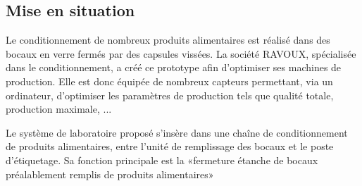 \documentclass[10pt,fleqn]{article} %
\begin{document}

\vspace{4.4cm}
\pagestyle{fancy}
\thispagestyle{plain}


\def\columnseprulecolor{\color{ocre}}
\setlength{\columnseprule}{0.4pt} 

\ifprof
\else
\begin{multicols}{2}
\fi


\subsection*{Mise en situation}
%

Le conditionnement de nombreux produits alimentaires est réalisé dans des bocaux en verre fermés par des capsules vissées. La société RAVOUX, spécialisée dans le conditionnement, a créé ce prototype afin d'optimiser ses machines de production. Elle est donc équipée de nombreux capteurs permettant, via un ordinateur, d'optimiser les paramètres de production tels que qualité totale, production maximale, ...

Le système de laboratoire proposé s'insère dans une chaîne de conditionnement de produits alimentaires, entre l'unité de remplissage des bocaux et le poste d'étiquetage. Sa fonction principale est la «fermeture étanche de bocaux préalablement remplis de produits alimentaires»


%


\end{multicols}
\end{document}
